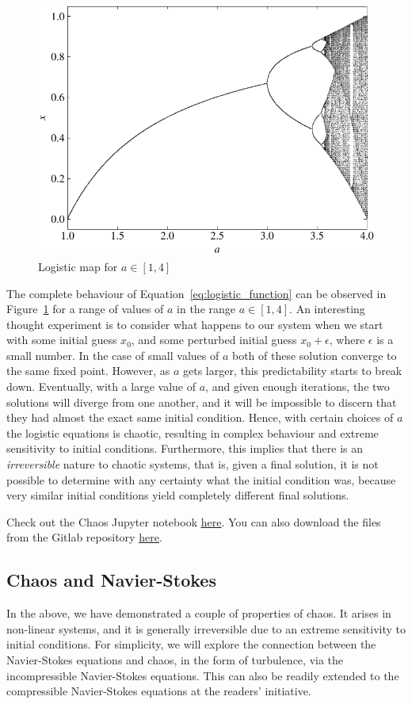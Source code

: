 \begin{figure}[htbp]
	\centering
	\includegraphics[width=0.65\linewidth]{Pictures/logistic_map}
	\caption{Logistic map for $a\in[1,4]$}
	\label{fig:logistic_map}
\end{figure}
The complete behaviour of Equation~\ref{eq:logistic_function} can be observed in Figure~\ref{fig:logistic_map} for a range of values of $a$ in the range $a\in[1,4]$. An interesting thought experiment is to consider what happens to our system when we start with some initial guess $x_0$, and some perturbed initial guess $x_0 + \epsilon$, where $\epsilon$ is a small number. In the case of small values of $a$ both of these solution converge to the same fixed point. However, as $a$ gets larger, this predictability starts to break down. Eventually, with a large value of $a$, and given enough iterations, the two solutions will diverge from one another, and it will be impossible to discern that they had almost the exact same initial condition. Hence, with certain choices of $a$ the logistic equations is chaotic, resulting in complex behaviour and extreme sensitivity to initial conditions. Furthermore, this implies that there is an {\it irreversible} nature to chaotic systems, that is, given a final solution, it is not possible to determine with any certainty what the initial condition was, because very similar initial conditions yield completely different final solutions.
\begin{jupyternote}
	Check out the Chaos Jupyter notebook \href{\binderurl}{\underline{here}}. You can also download the files from the Gitlab repository \href{\repourl}{\underline{here}}.
\end{jupyternote}

\subsection{Chaos and Navier-Stokes}
In the above, we have demonstrated a couple of properties of chaos. It arises in non-linear systems, and it is generally irreversible due to an extreme sensitivity to initial conditions. For simplicity, we will explore the connection between the Navier-Stokes equations and chaos, in the form of turbulence, via the incompressible Navier-Stokes equations. This can also be readily extended to the compressible Navier-Stokes equations at the readers' initiative.

